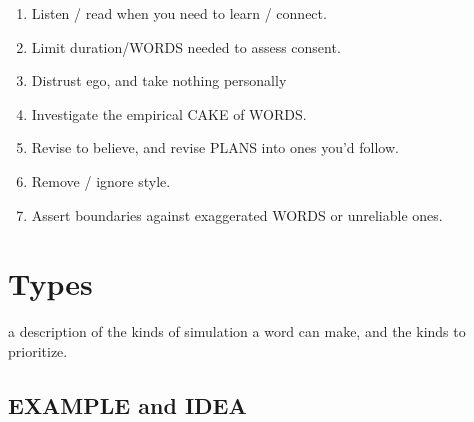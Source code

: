 \documentclass[
]{book}
\providecommand{\tightlist}{%
  \setlength{\itemsep}{0pt}\setlength{\parskip}{0pt}}
\begin{document}
\begin{enumerate}
\def\labelenumi{\arabic{enumi}.}
\setcounter{enumi}{37}
\tightlist
\item
  Listen / read when you need to learn / connect.
\item
  Limit duration/WORDS needed to assess consent.
\item
  Distrust ego, and take nothing personally
\item
  Investigate the empirical CAKE of WORDS.
\item
  Revise to believe, and revise PLANS into ones you'd follow.
\item
  Remove / ignore style.
\item
  Assert boundaries against exaggerated WORDS or unreliable ones.
\end{enumerate}

\hypertarget{types}{%
\section{Types}\label{types}}

a description of the kinds of simulation a word can make, and the kinds to prioritize.

\hypertarget{example-and-idea}{%
\subsection{EXAMPLE and IDEA}\label{example-and-idea}}
\end{document}

